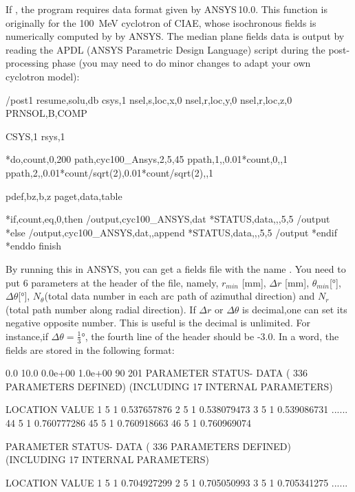 If , the program requires data format given by ANSYS\,10.0.  This function is originally for the \SI{100}{\mega\electronvolt} cyclotron of CIAE,
 whose isochronous fields is numerically computed by by ANSYS. The median plane fields data is output by reading the APDL (ANSYS Parametric Design Language) script
during the post-processing phase (you may need to do minor changes to adapt your own cyclotron model):

\begin{example}
/post1
resume,solu,db
csys,1
nsel,s,loc,x,0
nsel,r,loc,y,0
nsel,r,loc,z,0
PRNSOL,B,COMP

CSYS,1
rsys,1

*do,count,0,200
   path,cyc100_Ansys,2,5,45
   ppath,1,,0.01*count,0,,1
   ppath,2,,0.01*count/sqrt(2),0.01*count/sqrt(2),,1

   pdef,bz,b,z
   paget,data,table

   *if,count,eq,0,then
      /output,cyc100_ANSYS,dat
      *STATUS,data,,,5,5
      /output
   *else
      /output,cyc100_ANSYS,dat,,append
      *STATUS,data,,,5,5
      /output
   *endif
*enddo
finish
\end{example}

By running this in ANSYS, you can get a fields file with the name .
You need to  put 6 parameters at the header of the file, namely,
$r_{min}$ [\si{\milli\meter}], $\Delta r$ [\si{\milli\meter}], $\theta_{min}$[\si{\degree}], $\Delta \theta$[\si{\degree}],
$N_\theta$(total data number in each arc path of azimuthal direction) and $N_r$(total path number along radial direction).
If $\Delta r$ or $\Delta \theta$ is decimal,one can set its negative opposite number. This is useful is the decimal is unlimited.
For instance,if $\Delta \theta = \frac{1}{3} \si{\degree}$, the fourth line of the header should be -3.0.
In a word, the fields are stored in the following format:

\begin{example}
0.0
10.0
0.0e+00
1.0e+00
90
201
 PARAMETER STATUS- DATA  ( 336 PARAMETERS DEFINED)
                  (INCLUDING    17 INTERNAL PARAMETERS)

      LOCATION                VALUE
        1       5       1   0.537657876
        2       5       1   0.538079473
        3       5       1   0.539086731
                  ......
       44       5       1   0.760777286
       45       5       1   0.760918663
       46       5       1   0.760969074

 PARAMETER STATUS- DATA  ( 336 PARAMETERS DEFINED)
                  (INCLUDING    17 INTERNAL PARAMETERS)

      LOCATION                VALUE
        1       5       1   0.704927299
        2       5       1   0.705050993
        3       5       1   0.705341275
                  ......
\end{example}

